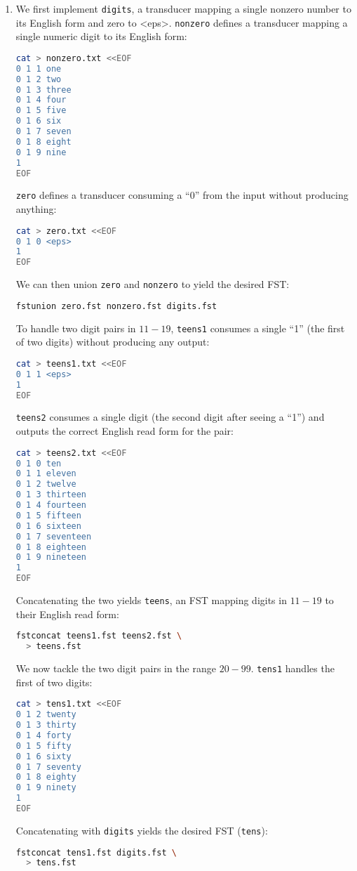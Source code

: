 \documentclass[a4paper,oneside,reqno]{amsart}
\begin{document}
\begin{enumerate}[label=\arabic*.]
  \item We first implement \texttt{digits}, a transducer mapping a single
    nonzero number to its English form and zero to <eps>. \texttt{nonzero}
    defines a transducer mapping a single numeric digit to its English form:
    \begin{lstlisting}[language=bash]
cat > nonzero.txt <<EOF
0 1 1 one
0 1 2 two
0 1 3 three
0 1 4 four
0 1 5 five
0 1 6 six
0 1 7 seven
0 1 8 eight
0 1 9 nine
1
EOF
    \end{lstlisting}
    \texttt{zero} defines a transducer consuming a ``0'' from the input
    without producing anything:
    \begin{lstlisting}[language=bash]
cat > zero.txt <<EOF
0 1 0 <eps>
1
EOF
    \end{lstlisting}
    We can then union \texttt{zero} and \texttt{nonzero} to yield
    the desired FST:
    \begin{lstlisting}[language=bash]
fstunion zero.fst nonzero.fst digits.fst
    \end{lstlisting}

    To handle two digit pairs in $11-19$, \texttt{teens1} consumes a single
    ``1'' (the first of two digits) without producing any output:
    \begin{lstlisting}[language=bash]
cat > teens1.txt <<EOF
0 1 1 <eps>
1
EOF
    \end{lstlisting}
    \texttt{teens2} consumes a single digit (the second digit after seeing a ``1'')
    and outputs the correct English read form for the pair:
    \begin{lstlisting}[language=bash]
cat > teens2.txt <<EOF
0 1 0 ten
0 1 1 eleven
0 1 2 twelve
0 1 3 thirteen
0 1 4 fourteen
0 1 5 fifteen
0 1 6 sixteen
0 1 7 seventeen
0 1 8 eighteen
0 1 9 nineteen
1
EOF
    \end{lstlisting}
    Concatenating the two yields \texttt{teens}, an FST mapping digits in $11-19$
    to their English read form:
    \begin{lstlisting}[language=bash]
fstconcat teens1.fst teens2.fst \
  > teens.fst
    \end{lstlisting}

    We now tackle the two digit pairs in the range $20-99$.
    \texttt{tens1} handles the first of two digits:
    \begin{lstlisting}[language=bash]
cat > tens1.txt <<EOF
0 1 2 twenty
0 1 3 thirty
0 1 4 forty
0 1 5 fifty
0 1 6 sixty
0 1 7 seventy
0 1 8 eighty
0 1 9 ninety
1
EOF
    \end{lstlisting}
    Concatenating with \texttt{digits} yields the desired FST (\texttt{tens}):
    \begin{lstlisting}[language=bash]
fstconcat tens1.fst digits.fst \
  > tens.fst
    \end{lstlisting}


\end{enumerate}
\end{document}
